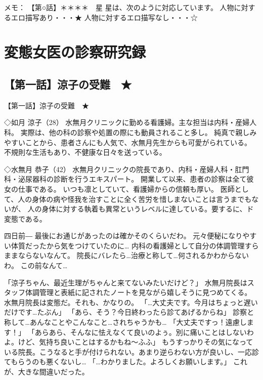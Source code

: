メモ：
【第○話】＊＊＊＊　星
星は、次のように対応しています。
人物に対するエロ描写あり・・・★
人物に対するエロ描写なし・・・☆

\chapter{変態女医の診察研究録}
\section{【第一話】涼子の受難　★}
【第一話】涼子の受難　★

◇如月 涼子（28）
水無月クリニックに勤める看護婦。主な担当は内科・産婦人科。
実際は、他の科の診察や処置の際にも動員されること多し。
純真で親しみやすいことから、患者さんにも人気で、水無月先生からも可愛がられている。
不規則な生活もあり、不健康な日々を送っている。

◇水無月 恭子（42）
水無月クリニックの院長であり、内科・産婦人科・肛門科・泌尿器科の診断を行うエキスパート。
開業して以来、患者の診察は全て彼女の仕事である。
いつも凛としていて、看護婦からの信頼も厚い。
医師として、人の身体の病や怪我を治すことに全く苦労を惜しまないことは言うまでもないが、
人の身体に対する執着も異常というレベルに達している。要するに、ド変態である。



四日前―
最後にお通じがあったのは確かそのくらいだわ。
元々便秘になりやすい体質だったから気をつけていたのに…
内科の看護婦として自分の体調管理すらままならないなんて。
院長にバレたら…治療と称して…何されるかわからないわ。
この前なんて…

「涼子ちゃん、最近生理がちゃんと来てないみたいだけど？」
水無月院長はスタッフ体調管理と表紙に記されたノートを見ながら嬉しそうに見つめてくる。
水無月院長は変態だ。それも、かなりの。
「…大丈夫です。今月はちょっと遅いだけです…たぶん」
「あら、そう？今日終わったら診てあげるからね」
診察と称して…あんなことやこんなこと…されちゃうかも…
「大丈夫ですっ！遠慮します！」
「あらあら、そんなに怯えなくて良いのよぅ。別に痛いことはしないわよ。けど、気持ち良いことはするかもね～ふふ」
もうすっかりその気になっている院長。こうなると手が付けられない。あまり逆らわない方が良いし、一応診てもらうのも悪くないし…
「…わかりました。よろしくお願いします。」
これが、大きな間違いだった。

